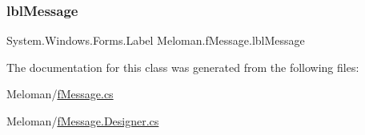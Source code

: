 \subsubsection{\texorpdfstring{lblMessage}{lblMessage}}
{\footnotesize\ttfamily System.\+Windows.\+Forms.\+Label Meloman.\+f\+Message.\+lbl\+Message}



The documentation for this class was generated from the following files\+:\begin{DoxyCompactItemize}
\item 
Meloman/\mbox{\hyperlink{f_message_8cs}{f\+Message.\+cs}}\item 
Meloman/\mbox{\hyperlink{f_message_8_designer_8cs}{f\+Message.\+Designer.\+cs}}\end{DoxyCompactItemize}
